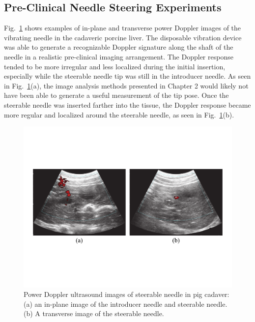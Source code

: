 \subsection{Pre-Clinical Needle Steering Experiments}
Fig.~\ref{fig:CadaverDoppler} shows examples of in-plane and transverse power Doppler images of the vibrating needle in the cadaveric porcine liver. The disposable vibration device was able to generate a recognizable Doppler signature along the shaft of the needle in a realistic pre-clinical imaging arrangement. The Doppler response tended to be more irregular and less localized during the initial insertion, especially while the steerable needle tip was still in the introducer needle. As seen in Fig.~\ref{fig:CadaverDoppler}(a), the image analysis methods presented in Chapter 2 would likely not have been able to generate a useful measurement of the tip pose. Once the steerable needle was inserted farther into the tissue, the Doppler response became more regular and localized around the steerable needle, as seen in Fig.~\ref{fig:CadaverDoppler}(b). 

\begin{figure}[!t]
\centering
\includegraphics[width = \columnwidth]{./Images/Chapter5/CadaverDoppler/CadaverDoppler.pdf}%
\caption[Power Doppler ultrasound images of steerable needle in pig cadaver]{Power Doppler ultrasound images of steerable needle in pig cadaver: (a) an in-plane image of the introducer needle and steerable needle. (b) A transverse image of the steerable needle.  }
\label{fig:CadaverDoppler}
\end{figure}  

